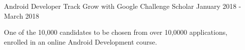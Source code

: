 

\begin{cventries}

  \cventry
    {Android Developer Track} %
    {Grow with Google Challenge Scholar} %
    {} %
    {January 2018 - March 2018} %
    {
      \begin{cvitems} %
        \item {One of the 10,000 candidates to be chosen from over 10,0000 applications, enrolled in an online Android Development course.}
      \end{cvitems}
    }

\end{cventries}

